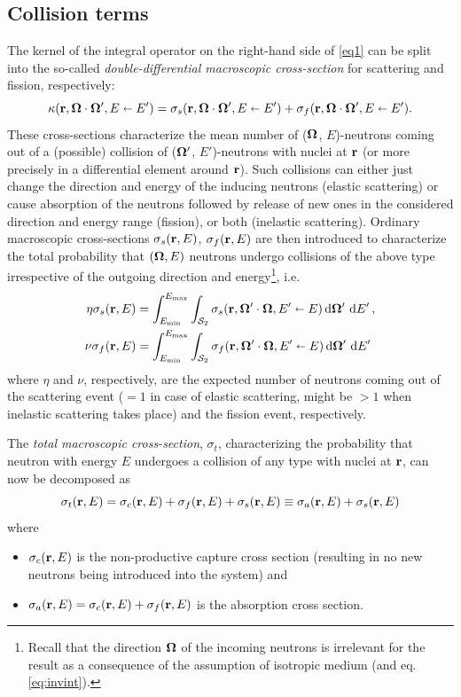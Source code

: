 \subsection{Collision terms}
The kernel of the integral operator on the right-hand side of \eqref{eq1} can be split into the so-called
\textit{double-differential macroscopic cross-section} for scattering and fission, respectively:
\begin{equation}\label{eq:splitting}
  \kappa(\br,\bomega\cdot\bomega',E\sla E') = \sigma_s(\br,\bomega\cdot\bomega',E\sla E') +
  \sigma_f(\br,\bomega\cdot\bomega',E\sla E').
\end{equation}
These cross-sections characterize the mean number of ($\bomega$, $E$)-neutrons coming out of a (possible) collision of 
($\bomega'$, $E'$)-neutrons with nuclei at $\br$ (or more precisely in a
differential element around $\br$). Such collisions can either just change the direction and energy of the
inducing neutrons (elastic scattering) or cause absorption of the neutrons followed by release of
new ones in the considered direction and energy range (fission), or both (inelastic scattering).
Ordinary macroscopic cross-sections $\sigma_s(\br,E)$, $\sigma_f(\br,E)$ are then introduced to characterize the total
probability that $(\bomega,E)$ neutrons undergo collisions of the above type irrespective of the outgoing direction and
energy\footnote{Recall that the direction $\bomega$ of the incoming neutrons is irrelevant for the result as a
consequence of the assumption of isotropic medium (and eq. \eqref{eq:invint}).}, i.e.
\begin{equation}\label{eq:ddifxs}
\begin{aligned}
\eta\sigma_s(\br, E) &=
\intE[']{\Emin}{\Emax}{\intA[']{\sigma_s(\br,\bomega'\cdot\bomega, E'\sla E)}},\\
\nu\sigma_f(\br, E) &= \intE[']{\Emin}{\Emax}{\intA[']{\sigma_f(\br,\bomega'\cdot\bomega, 
	E'\sla E)}}
\end{aligned}
\end{equation}
where $\eta$ and $\nu$, respectively, are the expected number of neutrons coming out of the scattering event ($=1$ in
case of elastic scattering, might be $> 1$ when inelastic scattering takes place) and the fission event, respectively. 

The \textit{total macroscopic cross-section}, $\sigma_t$, characterizing the probability that neutron with energy $E$
undergoes a collision of any type with nuclei at $\br$, can now be decomposed as 
\begin{equation}\label{eq:st}
  \sigma_t(\br,E) = \sigma_c(\br,E) + \sigma_f(\br,E) + \sigma_s(\br,E) \equiv \sigma_a(\br,E) + \sigma_s(\br,E)
\end{equation}
where
\begin{itemize}
	\item $\sigma_c(\br, E)$ is the non-productive capture cross section (resulting in no new neutrons being introduced
	into the system) and
  	\item $\sigma_a(\br, E) = \sigma_c(\br,E) + \sigma_f(\br,E)$ is the absorption cross section.
\end{itemize}

